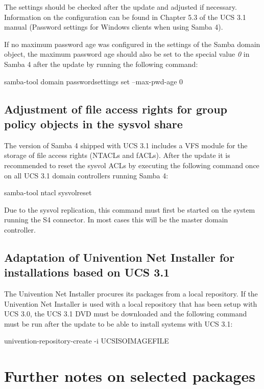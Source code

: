 The settings should be checked after the update and adjusted if
necessary. Information on the configuration can be found in Chapter
5.3 of the UCS 3.1 manual (Password settings for Windows clients when
using Samba 4).

If no maximum password age was configured in the settings
of the Samba domain object, the maximum password age should also be set
to the special value \emph{0} in Samba 4 after the update by running the
following command:
\begin{ucsConsoleInput}
samba-tool domain passwordsettings set --max-pwd-age 0
\end{ucsConsoleInput}

\section{Adjustment of file access rights for group policy objects in the sysvol share}
The version of Samba 4 shipped with UCS 3.1 includes a VFS
module for the storage of file access rights (NTACLs and fACLs). After
the update it is recommended to reset the sysvol ACLs by
executing the following command once on all UCS 3.1 domain controllers
running Samba 4:
\begin{ucsConsoleInput}
samba-tool ntacl sysvolreset
\end{ucsConsoleInput}
Due to the sysvol replication, this command must first be started on the
system running the S4 connector. In most cases this will be the master domain controller.

\section{Adaptation of Univention Net Installer for installations based on UCS 3.1}
The Univention Net Installer procures its packages from a local
repository. If the Univention Net Installer is used with a local
repository that has been setup with UCS 3.0, the UCS 3.1 DVD must be downloaded
and the following command must be run after the update to be able to
install systems with UCS 3.1:

\begin{ucsConsoleInput}
univention-repository-create -i UCSISOIMAGEFILE
\end{ucsConsoleInput}

\chapter{Further notes on selected packages}

